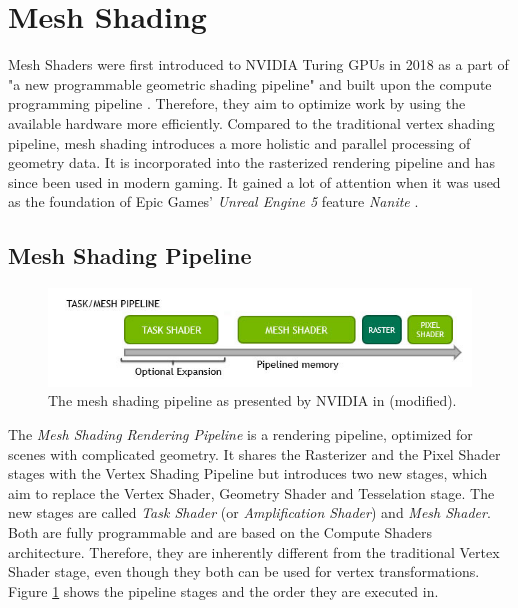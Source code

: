 \section{Mesh Shading}  \label{sec-mesh-shading}

Mesh Shaders were first introduced to NVIDIA Turing \ac{GPU}s in 2018 as a part of "a new programmable 
geometric shading pipeline" and built upon the compute programming pipeline \cite{Kubisch2018}. 
Therefore, they aim to optimize work by using the available hardware more efficiently. Compared to the 
traditional vertex shading pipeline, mesh shading introduces a more holistic and parallel processing of 
geometry data. It is incorporated into the rasterized rendering pipeline and has since been used in modern 
gaming. It gained a lot of attention when it was used as the foundation of Epic Games' \emph{Unreal Engine 5} 
feature \emph{Nanite} \cite{Karis2021}.\\


\subsection*{Mesh Shading Pipeline} \label{subsec-the-mesh-shading-pipeline}

\begin{figure}[h]
    \centering
    \includegraphics[width=\linewidth]{images/graphics/mesh-rendering-pipeline.jpg}
    \caption{The mesh shading pipeline as presented by NVIDIA in \cite{Kubisch2018} (modified).}
    \label{fig:mesh-rendering-pipeline}
\end{figure}

\noindent
The \emph{Mesh Shading Rendering Pipeline} is a rendering pipeline, optimized for scenes with complicated 
geometry. It shares the Rasterizer and the Pixel Shader stages with the Vertex Shading Pipeline but 
introduces two new stages, which aim to replace the Vertex Shader, Geometry Shader and Tesselation stage.
The new stages are called \emph{Task Shader} (or \emph{Amplification Shader}) and \emph{Mesh Shader}. Both 
are fully programmable and are based on the Compute Shaders architecture. Therefore, they are inherently different 
from the traditional Vertex Shader stage, even though they both can be used for vertex transformations.
Figure \ref{fig:mesh-rendering-pipeline} shows the pipeline stages and the order they are executed in. \\

